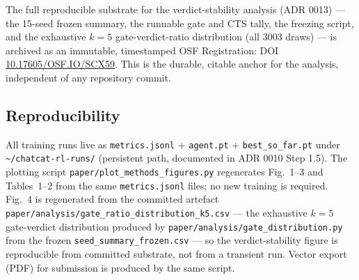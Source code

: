 \documentclass{article}
\newcommand{\code}[1]{\texttt{#1}}
\begin{document}
\noindent The full reproducible substrate for the verdict-stability analysis (ADR 0013) --- the 15-seed frozen summary, the runnable gate and CTS tally, the freezing script, and the exhaustive $k=5$ gate-verdict-ratio distribution (all $3003$ draws) --- is archived as an immutable, timestamped OSF Registration: DOI \href{https://doi.org/10.17605/OSF.IO/SCX59}{10.17605/OSF.IO/SCX59}. This is the durable, citable anchor for the analysis, independent of any repository commit.

\subsection{Reproducibility}
\label{app:A.2}

{\sloppy
All training runs live as \code{metrics.jsonl} + \code{agent.pt} + \code{best\_so\_far.pt} under \code{\textasciitilde/chatcat-rl-runs/} (persistent path, documented in ADR 0010 Step 1.5). The plotting script \code{paper/plot\_methods\_figures.py} regenerates Fig.~1--3 and Tables~1--2 from the same \code{metrics.jsonl} files; no new training is required. Fig.~4 is regenerated from the committed artefact \code{paper/analysis/gate\_ratio\_distribution\_k5.csv} --- the exhaustive $k=5$ gate-verdict distribution produced by \code{paper/analysis/gate\_distribution.py} from the frozen \code{seed\_summary\_frozen.csv} --- so the verdict-stability figure is reproducible from committed substrate, not from a transient run. Vector export (PDF) for submission is produced by the same script.\par}
\end{document}
